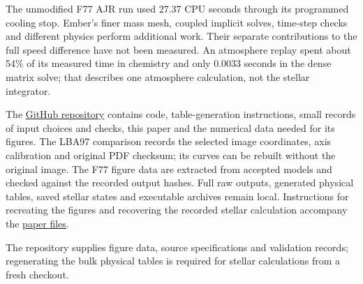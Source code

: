 \documentclass[11pt,letterpaper]{article}
\newcommand{\doc}[2]{\href{https://github.com/oklo/ember/blob/codex/atmosphere5000-density-checks/#1}{#2}}
\begin{document}
The unmodified F77 AJR run used 27.37 CPU seconds through its programmed
cooling stop. Ember's finer mass mesh, coupled implicit solves, time-step checks
and different physics perform additional work. Their separate contributions
to the full speed difference have not been measured. An atmosphere
replay spent about 54\% of its measured time in chemistry and only 0.0033 seconds
in the dense matrix solve; that describes one atmosphere calculation, not
the stellar integrator.

The \href{https://github.com/oklo/ember}{GitHub repository} contains code,
table-generation instructions, small records of input choices and checks,
this paper and the numerical data needed for its figures. The LBA97 comparison
records the selected image coordinates, axis calibration and original PDF
checksum; its curves can be rebuilt without the original image. The F77 figure data
are extracted from accepted models and checked against the recorded output
hashes. Full raw outputs, generated physical tables, saved stellar states and
executable archives remain local. Instructions for recreating the figures
and recovering the recorded stellar calculation accompany the
\doc{docs/reports/2026-09-12/README.md}{paper files}.

The
repository supplies figure data, source specifications and validation records;
regenerating the bulk physical tables is required for stellar calculations
from a fresh checkout.
\end{document}
